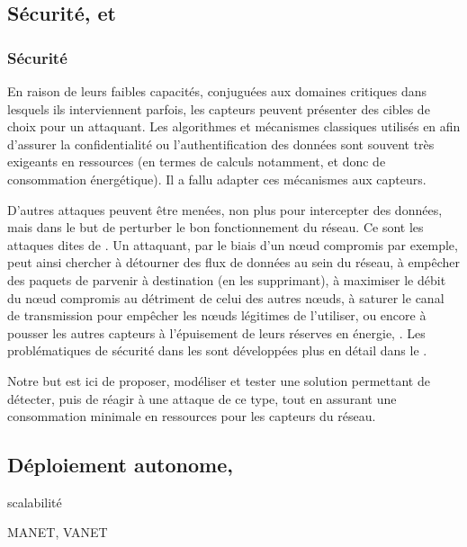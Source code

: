         \subsection{Sécurité,  et \resilience}


        \subsubsection{Sécurité}
En raison de leurs faibles capacités, conjuguées aux domaines critiques dans lesquels ils interviennent parfois, les capteurs peuvent présenter des cibles de choix pour un attaquant.
Les algorithmes et mécanismes classiques utilisés en  afin d'assurer la confidentialité ou l'authentification des données sont souvent très exigeants en ressources (en termes de calculs notamment, et donc de consommation énergétique).
Il a fallu adapter ces mécanismes aux capteurs.

D'autres attaques peuvent être menées, non plus pour intercepter des données, mais dans le but de perturber le bon fonctionnement du réseau.
Ce sont les attaques dites de \textit{\dds}.
Un attaquant, par le biais d'un nœud compromis par exemple, peut ainsi chercher à détourner des flux de données au sein du réseau, à empêcher des paquets de parvenir à destination (en les supprimant), à maximiser le débit du nœud compromis au détriment de celui des autres nœuds, à saturer le canal de transmission pour empêcher les nœuds légitimes de l'utiliser, ou encore à pousser les autres capteurs à l'épuisement de leurs réserves en énergie, \etc.
Les problématiques de sécurité dans les \rcs sont développées plus en détail dans le .

Notre but est ici de proposer, modéliser et tester une solution permettant de détecter, puis de réagir à une attaque de ce type, tout en assurant une consommation minimale en ressources pour les capteurs du réseau.

        \subsection{Déploiement autonome, }
    scalabilité

    MANET, VANET
